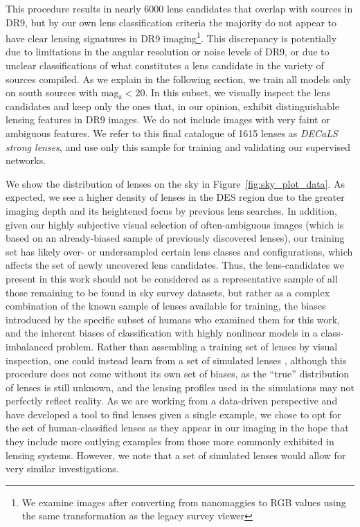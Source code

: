 \documentclass{aastex631}
\newcommand{\zmag}{mag$_{\mathrm{z}}$}
\begin{document}
This procedure results in nearly 6000 lens candidates that overlap with sources in DR9, but by our own lens classification criteria the majority do not appear to have clear lensing signatures in DR9 imaging\footnote{We examine images after converting from nanomaggies to RGB values using the same transformation as the legacy survey viewer}. This discrepancy is potentially due to limitations in the angular resolution or noise levels of DR9, or due to unclear classifications of what constitutes a lens candidate in the variety of sources compiled. As we explain in the following section, we train all models only on south sources with \zmag $<20$. In this subset, we visually inspect the lens candidates and keep only the ones that, in our opinion, exhibit distinguishable lensing features in DR9 images. We do not include images with very faint or ambiguous features. We refer to this final catalogue of 1615 lenses as {\textit{DECaLS strong lenses}}, and use only this sample for training and validating our supervised networks.

We show the distribution of lenses on the sky in Figure~\ref{fig:sky_plot_data}. As expected, we see a higher density of lenses in the DES region due to the greater imaging depth and its heightened focus by previous lens searches. In addition, given our highly subjective visual selection of often-ambiguous images (which is based on an already-biased sample of previously discovered lenses), our training set has likely over- or undersampled certain lens classes and configurations, which affects the set of newly uncovered lens candidates. Thus, the lens-candidates we present in this work should not be considered as a representative sample of all those remaining to be found in sky survey datasets, but rather as a complex combination of the known sample of lenses available for training, the biases introduced by the specific subset of humans who examined them for this work, and the inherent biases of classification with highly nonlinear models in a class-imbalanced problem. Rather than assembling a training set of lenses by visual inspection, one could instead learn from a set of simulated lenses \citep{JacobsI, LI}, although this procedure does not come without its own set of biases, as the ``true'' distribution of lenses is still unknown, and the lensing profiles used in the simulations may not perfectly reflect reality. As we are working from a data-driven perspective and have developed a tool to find lenses given a single example, we chose to opt for the set of human-classified lenses as they appear in our imaging in the hope that they include more outlying examples from those more commonly exhibited in lensing systems. However, we note that a set of simulated lenses would allow for very similar investigations.
\end{document}
